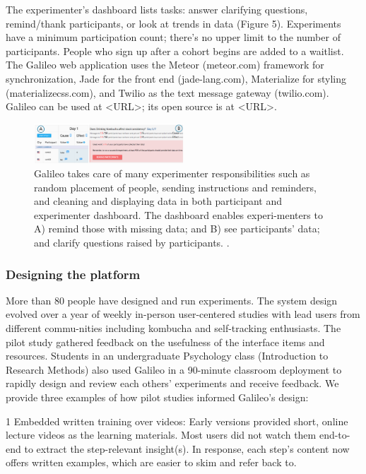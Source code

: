 The experimenter’s dashboard lists tasks: answer clarifying questions, remind/thank participants, or look at trends in data (Figure 5). Experiments have a minimum participation count; there’s no upper limit to the number of participants. People who sign up after a cohort begins are added to a waitlist.
The Galileo web application uses the Meteor (meteor.com) framework for synchronization, Jade for the front end (jade-lang.com), Materialize for styling (materializecss.com), and Twilio as the text message gateway (twilio.com). Galileo can be used at <URL>; its open source is at <URL>. 

\begin{figure}[h] 
  \centering
  \includegraphics[width=0.5\textwidth]{figures/galileo/galileo-2-run-1}
  \caption[]
{Galileo takes care of many experimenter responsibilities such as random placement of people, sending instructions and reminders, and cleaning and displaying data in both participant and experimenter dashboard. The dashboard enables experi-menters to A) remind those with missing data; and B) see participants’ data; and clarify questions raised by participants. . }
  \label{fig:galileo-2-run-1}
\end{figure}
 

\subsubsection{Designing the platform}
More than 80 people have designed and run experiments. The system design evolved over a year of weekly in-person user-centered studies with lead users from different commu-nities including kombucha and self-tracking enthusiasts. The pilot study gathered feedback on the usefulness of the interface items and resources. Students in an undergraduate Psychology class (Introduction to Research Methods) also used Galileo in a 90-minute classroom deployment to rapidly design and review each others’ experiments and receive feedback. We provide three examples of how pilot studies informed Galileo’s design:

1 Embedded written training over videos: Early versions provided short, online lecture videos as the learning materials. Most users did not watch them end-to-end to extract the step-relevant insight(s). In response, each step’s content now offers written examples, which are easier to skim and refer back to. 

